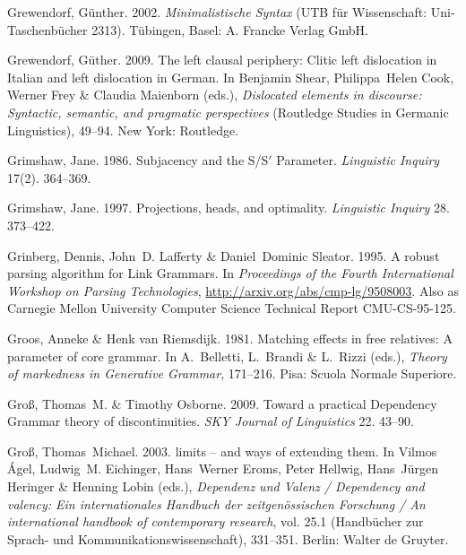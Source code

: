 \begin{thebibliography}{1420}
Grewendorf, G{\"u}nther. 2002.
\newblock \emph{{Minimalistische Syntax}} (UTB f{\"u}r Wissenschaft:
  Uni-Taschenb{\"u}cher 2313).
\newblock T{\"u}bingen, Basel: A. Francke Verlag GmbH.

Grewendorf, G{\"u}ther. 2009.
\newblock The left clausal periphery: {Clitic} left dislocation in {Italian}
  and left dislocation in {German}.
\newblock In Benjamin Shear, Philippa~Helen Cook, Werner Frey \& Claudia
  Maienborn (eds.), \emph{Dislocated elements in discourse: {Syntactic},
  semantic, and pragmatic perspectives}  (Routledge Studies in {Germanic}
  Linguistics), 49--94. New York: Routledge.

Grimshaw, Jane. 1986.
\newblock Subjacency and the {S/S$'$ Parameter}.
\newblock \emph{Linguistic Inquiry} 17(2). 364--369.

Grimshaw, Jane. 1997.
\newblock Projections, heads, and optimality.
\newblock \emph{Linguistic Inquiry} 28. 373--422.

Grinberg, Dennis, John~D. Lafferty \& Daniel~Dominic Sleator. 1995.
\newblock A robust parsing algorithm for {Link Grammars}.
\newblock In \emph{Proceedings of the {Fourth International Workshop on Parsing
  Technologies}}, \urlprefix\url{http://arxiv.org/abs/cmp-lg/9508003}.
\newblock Also as {Carnegie Mellon University Computer Science} Technical
  Report {CMU-CS-95-125}.

Groos, Anneke \& Henk van Riemsdijk. 1981.
\newblock Matching effects in free relatives: {A} parameter of core grammar.
\newblock In A.~Belletti, L.~Brandi \& L.~Rizzi (eds.), \emph{Theory of
  markedness in {Generative Grammar}}, 171--216. Pisa: Scuola Normale
  Superiore.

Gro{\ss}, Thomas~M. \& Timothy Osborne. 2009.
\newblock Toward a practical {Dependency Grammar} theory of discontinuities.
\newblock \emph{SKY Journal of Linguistics} 22. 43--90.

Gro{\ss}, Thomas~Michael. 2003.
 limits -- and ways of extending them.
\newblock In Vilmos {\'A}gel, Ludwig~M. Eichinger, Hans~Werner Eroms, Peter
  Hellwig, Hans~J{\"u}rgen Heringer \& Henning Lobin (eds.), \emph{{Dependenz
  und Valenz} / {Dependency} and valency: {Ein internationales Handbuch der
  zeitgen{\"o}ssischen Forschung} / {An} international handbook of contemporary
  research}, vol. 25.1  (Hand\-b{\"u}\-cher zur Sprach- und
  Kommunikationswissenschaft), 331--351. Berlin: Walter de Gruyter.


\end{thebibliography}
